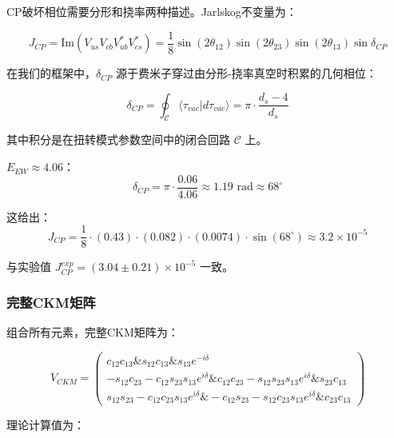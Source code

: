 CP破坏相位需要分形和挠率两种描述。Jarlskog不变量为：

\begin{equation}
    J_{CP} = \text{Im}(V_{us} V_{cb} V_{ub}^* V_{cs}^*) = \frac{1}{8} \sin(2\theta_{12}) \sin(2\theta_{23}) \sin(2\theta_{13}) \sin\delta_{CP}
\end{equation}

在我们的框架中，$\delta_{CP}$ 源于费米子穿过由分形-挠率真空时积累的几何相位：

\begin{equation}
    \delta_{CP} = \oint_\mathcal{C} \langle \tau_{vac} | d\tau_{vac} \rangle = \pi \cdot \frac{d_s - 4}{d_s}
\end{equation}

其中积分是在扭转模式参数空间中的闭合回路 $\mathcal{C}$ 上。

$E_{EW} \approx 4.06$：
\begin{equation}
    \delta_{CP} = \pi \cdot \frac{0.06}{4.06} \approx 1.19 \text{ rad} \approx 68^\circ
\end{equation}

这给出：
\begin{equation}
    J_{CP} = \frac{1}{8} \cdot (0.43) \cdot (0.082) \cdot (0.0074) \cdot \sin(68^\circ) \approx 3.2 \times 10^{-5}
\end{equation}

与实验值 $J_{CP}^{exp} = (3.04 \pm 0.21) \times 10^{-5}$ 一致。

\subsubsection{完整CKM矩阵}

组合所有元素，完整CKM矩阵为：

\begin{equation}
    V_{CKM} = 
    \begin{pmatrix}
        c_{12}c_{13} \& s_{12}c_{13} \& s_{13}e^{-i\delta} \\
        -s_{12}c_{23} - c_{12}s_{23}s_{13}e^{i\delta} \& c_{12}c_{23} - s_{12}s_{23}s_{13}e^{i\delta} \& s_{23}c_{13} \\
        s_{12}s_{23} - c_{12}c_{23}s_{13}e^{i\delta} \& -c_{12}s_{23} - s_{12}c_{23}s_{13}e^{i\delta} \& c_{23}c_{13}
    \end{pmatrix}
\end{equation}

理论计算值为：

